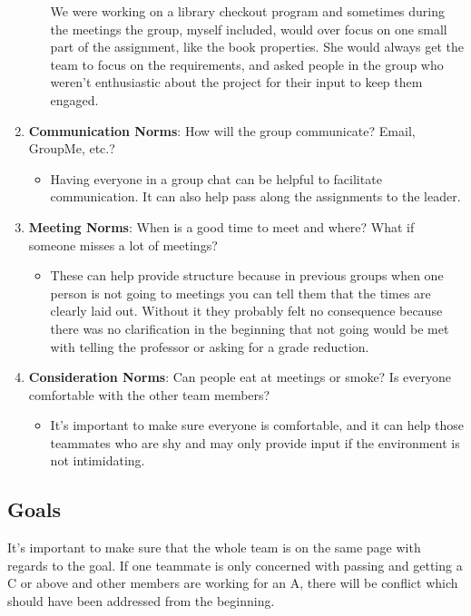 \documentclass[
10pt, %
letterpaper, %
oneside, %
headinclude,footinclude, %
BCOR5mm, %
]{scrartcl}
\begin{document}
\begin{enumerate}
\begin{itemize}
  We were working on a library checkout program and sometimes during the
  meetings the group, myself included, would over focus on one small
  part of the assignment, like the book properties. She would always get
  the team to focus on the requirements, and asked people in the group
  who weren't enthusiastic about the project for their input to keep
  them engaged.
\end{itemize}
\item
  \textbf{Communication Norms}: How will the group communicate? Email,
  GroupMe, etc.?
\begin{itemize}
\item
  Having everyone in a group chat can be helpful to facilitate
  communication. It can also help pass along the assignments to the
  leader.
\end{itemize}
\item
  \textbf{Meeting Norms}: When is a good time to meet and where? What if
  someone misses a lot of meetings?
\begin{itemize}
\item
  These can help provide structure because in previous groups when one
  person is not going to meetings you can tell them that the times are
  clearly laid out. Without it they probably felt no consequence because
  there was no clarification in the beginning that not going would be
  met with telling the professor or asking for a grade reduction.
\end{itemize}
\item
  \textbf{Consideration Norms}: Can people eat at meetings or smoke? Is
  everyone comfortable with the other team members?
\begin{itemize}
\item
  It's important to make sure everyone is comfortable, and it can help
  those teammates who are shy and may only provide input if the
  environment is not intimidating.
\end{itemize}
\end{enumerate}

\subsection{Goals}

It's important to make sure that the whole team is on the same page with
regards to the goal. If one teammate is only concerned with passing and
getting a C or above and other members are working for an A, there will
be conflict which should have been addressed from the beginning.
\end{document}

